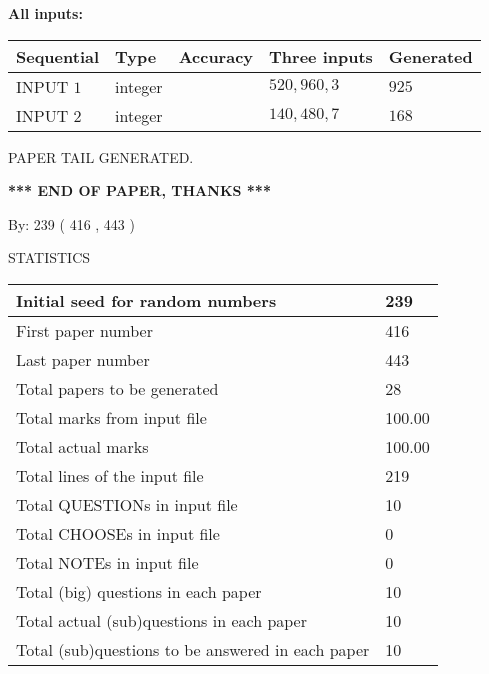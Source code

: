 \documentclass{ctexart}
\begin{document}
   
   
   
\noindent\vspace{0.1in}\hspace{-0.08in} {\textbf{\Large{All inputs: }}}
   
   
  
  
\noindent\begin{tabular}{|l|l|l|l|l|}
\hline
 Sequential & Type & Accuracy & Three inputs & Generated \\ 
\hline
 
 
  INPUT $  1 $ & integer &  & $
 520
 , 
 960
 , 
 3
 $ & $ 925 $ 
 \\  \hline  
 
 
  INPUT $  2 $ & integer &  & $
 140
 , 
 480
 , 
 7
 $ & $ 168 $ 
 \\  \hline  
 \end{tabular}
   
   
   
   
   
   
 \vspace{0.2in}
 
   
   
\vspace{2.0in} PAPER TAIL GENERATED.
   
   
   
   
\vspace{1.0in} 
{\textbf{\large{ *** END OF PAPER, THANKS *** }}} 
   
   
\hspace{1.0in} By: 
 239 ( 416 ,  443 )
   
   
   
\vspace{0.2in}
\vspace{0.2in}
   
   
 \newpage
\setcounter{page}{1} 
   
   
 {\LARGE{STATISTICS}}
   
\vspace{0.2in}
   
 \begin{tabular}{|l|l|}
 \hline
 Initial seed for random numbers & 239  \\
\hline
 First paper number & 416  \\
\hline
 Last  paper number & 443  \\
\hline
 Total papers to be generated & 28  \\
\hline
Total marks from input file & 100.00 \\
\hline
Total actual marks & 100.00 \\
\hline
 Total lines of the input file & 219  \\
 \hline
 Total QUESTIONs in input file & 10  \\
\hline
 Total CHOOSEs in input file & 0  \\
\hline
 Total NOTEs in input file & 0  \\
\hline
 Total (big) questions in each paper & 10  \\
\hline
 Total actual (sub)questions in each paper & 10  \\
\hline
 Total (sub)questions to be answered in each paper & 10  \\
\hline
 \end{tabular}
   
\end{document}
